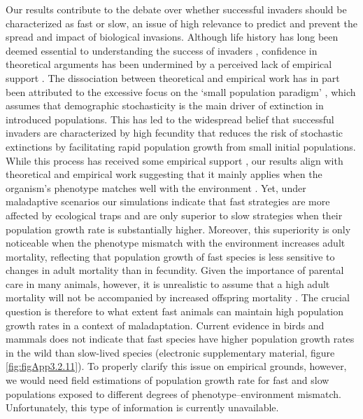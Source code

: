 Our results contribute to the debate over whether successful
invaders should be characterized as fast or slow, an issue of
high relevance to predict and prevent the spread and impact of
biological invasions. Although life history has long been
deemed essential to understanding the success of invaders
\citep{Lewontin1969}, confidence in theoretical arguments has been undermined
by a perceived lack of empirical support \citep{Sol2012a}. The dissociation
between theoretical and empirical work has in part been attributed
to the excessive focus on the ‘small population paradigm’
\citep{Sol2016}, which assumes that demographic stochasticity is the main
driver of extinction in introduced populations. This has led to
the widespread belief that successful invaders are characterized
by high fecundity that reduces the risk of stochastic
extinctions by facilitating rapid population growth from
small initial populations. While this process has received
some empirical support \citep{Allen2017, Capellini2015}, our results align with theoretical
and empirical work suggesting that it mainly applies when
the organism’s phenotype matches well with the environment
\citep{Sol2012a, Jeppsson2012}. Yet, under maladaptive scenarios our simulations
indicate that fast strategies are more affected by ecological traps
and are only superior to slow strategies when their population
growth rate is substantially higher. Moreover, this superiority
is only noticeable when the phenotype mismatch with the
environment increases adult mortality, reflecting that population
growth of fast species is less sensitive to changes in
adult mortality than in fecundity. Given the importance of parental
care in many animals, however, it is unrealistic to assume
that a high adult mortality will not be accompanied by
increased offspring mortality \citep{Santema2018}. The crucial question is
therefore to what extent fast animals can maintain high population
growth rates in a context of maladaptation. Current evidence
in birds and mammals does not indicate that fast species
have higher population growth rates in the wild than slow-lived
species (electronic supplementary material, figure \ref{fig:figApp3.2.11}).
To properly clarify this issue on empirical grounds, however,
we would need field estimations of population growth rate
for fast and slow populations exposed to different degrees of
phenotype–environment mismatch. Unfortunately, this type
of information is currently unavailable.

